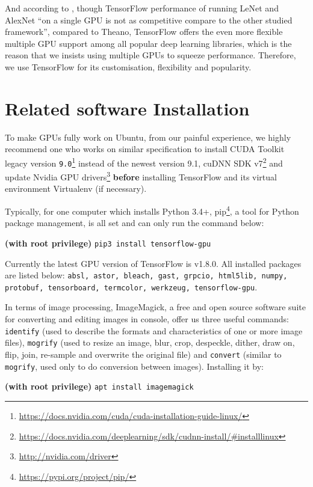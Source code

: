 And according to \cite{DBLP:journals/corr/BahrampourRSS15}, though TensorFlow performance of running LeNet and AlexNet ``on a single GPU is not as competitive compare to the other studied framework'', compared to Theano, TensorFlow offers the even more flexible multiple GPU support among all popular deep learning libraries, which is the reason that we insists using multiple GPUs to squeeze performance. Therefore, we use TensorFlow for its customisation, flexibility and popularity.

\section{Related software Installation}
To make GPUs fully work on Ubuntu, from our painful experience, we highly recommend one who works on similar specification to install CUDA Toolkit legacy version \texttt{9.0}\footnote{\url{https://docs.nvidia.com/cuda/cuda-installation-guide-linux/}} instead of the newest version 9.1, cuDNN SDK v7\footnote{\url{https://docs.nvidia.com/deeplearning/sdk/cudnn-install/\#installlinux}} and update Nvidia GPU drivers\footnote{\url{http://nvidia.com/driver}} \textbf{before} installing TensorFlow and its virtual environment Virtualenv (if necessary).

Typically, for one computer which installs Python 3.4+, pip\footnote{\url{https://pypi.org/project/pip/}}, a tool for Python package management, is all set and can only run the command below:

\textbf{(with root privilege)} \texttt{pip3 install tensorflow-gpu}

Currently the latest GPU version of TensorFlow is v1.8.0. All installed packages are listed below: \texttt{absl, astor, bleach, gast, grpcio, html5lib, numpy, protobuf, tensorboard, termcolor, werkzeug, tensorflow-gpu}.

In terms of image processing, ImageMagick\textsuperscript{\textregistered}, a free and open source software suite for converting and editing images in console, offer us three useful commands: \texttt{identify} (used to describe the formats and characteristics of one or more image files), \texttt{mogrify} (used to resize an image, blur, crop, despeckle, dither, draw on, flip, join, re-sample and overwrite the original file) and \texttt{convert} (similar to \texttt{mogrify}, used only to do conversion between images). Installing it by:

\textbf{(with root privilege)} \texttt{apt install imagemagick}

